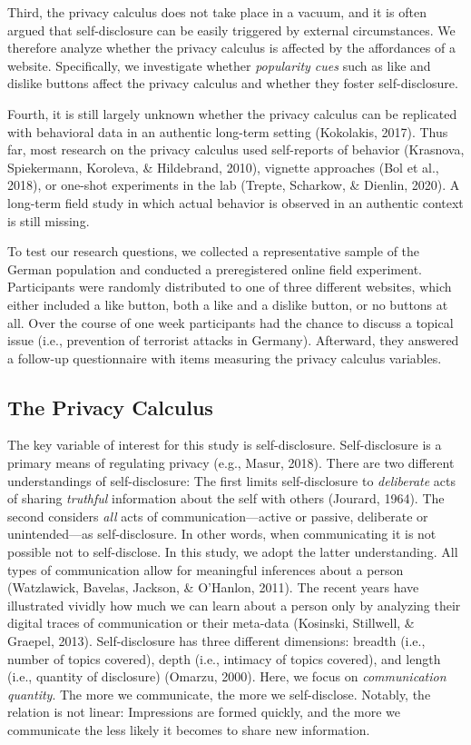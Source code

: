 \documentclass[
  english,
  man,floatsintext]{apa6}
\begin{document}
Third, the privacy calculus does not take place in a vacuum, and it is often argued that self-disclosure can be easily triggered by external circumstances.
We therefore analyze whether the privacy calculus is affected by the affordances of a website.
Specifically, we investigate whether \emph{popularity cues} such as like and dislike buttons affect the privacy calculus and whether they foster self-disclosure.

Fourth, it is still largely unknown whether the privacy calculus can be replicated with behavioral data in an authentic long-term setting (Kokolakis, 2017).
Thus far, most research on the privacy calculus used self-reports of behavior (Krasnova, Spiekermann, Koroleva, \& Hildebrand, 2010), vignette approaches (Bol et al., 2018), or one-shot experiments in the lab (Trepte, Scharkow, \& Dienlin, 2020).
A long-term field study in which actual behavior is observed in an authentic context is still missing.

To test our research questions, we collected a representative sample of the German population and conducted a preregistered online field experiment.
Participants were randomly distributed to one of three different websites, which either included a like button, both a like and a dislike button, or no buttons at all.
Over the course of one week participants had the chance to discuss a topical issue (i.e., prevention of terrorist attacks in Germany).
Afterward, they answered a follow-up questionnaire with items measuring the privacy calculus variables.

\hypertarget{the-privacy-calculus}{%
\subsection{The Privacy Calculus}\label{the-privacy-calculus}}

The key variable of interest for this study is self-disclosure.
Self-disclosure is a primary means of regulating privacy (e.g., Masur, 2018).
There are two different understandings of self-disclosure:
The first limits self-disclosure to \emph{deliberate} acts of sharing \emph{truthful} information about the self with others (Jourard, 1964).
The second considers \emph{all} acts of communication---active or passive, deliberate or unintended---as self-disclosure.
In other words, when communicating it is not possible not to self-disclose.
In this study, we adopt the latter understanding.
All types of communication allow for meaningful inferences about a person (Watzlawick, Bavelas, Jackson, \& O'Hanlon, 2011).
The recent years have illustrated vividly how much we can learn about a person only by analyzing their digital traces of communication or their meta-data (Kosinski, Stillwell, \& Graepel, 2013).
Self-disclosure has three different dimensions: breadth (i.e., number of topics covered), depth (i.e., intimacy of topics covered), and length (i.e., quantity of disclosure) (Omarzu, 2000).
Here, we focus on \emph{communication quantity}.
The more we communicate, the more we self-disclose.
Notably, the relation is not linear:
Impressions are formed quickly, and the more we communicate the less likely it becomes to share new information.
\end{document}
